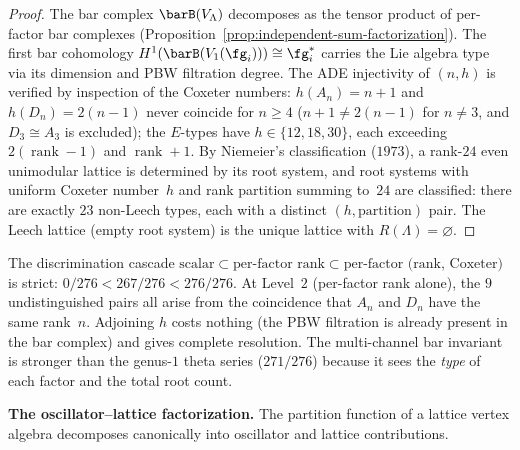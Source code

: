 \begin{proof}
The bar complex $\barB(V_\Lambda)$ decomposes as the tensor
product of per-factor bar complexes
(Proposition~\ref{prop:independent-sum-factorization}).
The first bar cohomology
$H^1(\barB(V_1(\fg_i))) \cong \fg_i^*$ carries the Lie
algebra type via its dimension and PBW filtration degree.
The ADE injectivity of $(n, h)$ is verified by
inspection of the Coxeter numbers:
$h(A_n) = n+1$ and $h(D_n) = 2(n-1)$
never coincide for $n \geq 4$
($n+1 \ne 2(n-1)$ for $n \ne 3$, and $D_3 \cong A_3$ is excluded);
the $E$-types have $h \in \{12, 18, 30\}$, each
exceeding $2(\operatorname{rank}-1)$ and $\operatorname{rank}+1$.
By Niemeier's classification
\textup{(}$1973$\textup{)},
a rank-$24$ even unimodular lattice is determined by its
root system, and root systems with uniform Coxeter number~$h$
and rank partition summing to~$24$ are classified:
there are exactly $23$ non-Leech types, each with a
distinct $(h, \text{partition})$ pair.
The Leech lattice (empty root system) is the unique lattice with
$R(\Lambda) = \varnothing$.
\end{proof}

\begin{remark}
\label{rem:discrimination-hierarchy}
The discrimination cascade
$\text{scalar} \subset \text{per-factor rank}
 \subset \text{per-factor (rank, Coxeter)}$
is strict: $0/276 < 267/276 < 276/276$.
At Level~$2$ (per-factor rank alone), the $9$
undistinguished pairs all arise from the coincidence
that $A_n$ and $D_n$ have the same rank~$n$.
Adjoining $h$ costs nothing (the
PBW filtration is already present in the bar complex)
and gives complete resolution.
The multi-channel bar invariant is stronger than
the genus-$1$ theta series ($271/276$) because
it sees the \emph{type} of each factor and the total root count.
\end{remark}

\medskip
\noindent\textbf{The oscillator--lattice factorization.}\;
The partition function of a lattice vertex
algebra decomposes canonically into oscillator and lattice contributions.

